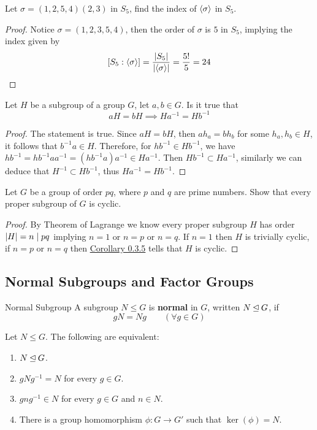 \documentclass[12pt,a4paper]{article}
\begin{document}
    \begin{ex}
        Let $\sigma=(1,2,5,4)(2,3)$ in $S_5$, find the index of $\langle \sigma \rangle$ in $S_5$.
    \end{ex}
    \begin{proof}
        Notice $\sigma=(1,2,3,5,4)$, then the order of $\sigma$ is $5$ in $S_5$, implying the index given by 
        \[
            [S_5:\langle \sigma \rangle]=\frac{\left\lvert S_5 \right\rvert}{\left\lvert \langle \sigma \rangle \right\rvert}=\frac{5!}{5}=24
        \]
    \end{proof}
    \bigskip

    \begin{ex}
        Let $H$ be a subgroup of a group $G$, let $a,b\in G$. Is it true that 
        \[
            aH=bH\implies Ha^{-1}=Hb^{-1}
        \]
    \end{ex}
    \begin{proof}
        The statement is true. Since $aH=bH$, then $ah_a=bh_b$ for some $h_a,h_b\in H$, it follows that $b^{-1}a\in H$. Therefore, for $hb^{-1}\in Hb^{-1}$, we have $hb^{-1}=hb^{-1}aa^{-1}=(hb^{-1}a)a^{-1}\in Ha^{-1}$. Then $Hb^{-1}\subset Ha^{-1}$, similarly we can deduce that $H^{-1}\subset Hb^{-1}$, thus $Ha^{-1}=Hb^{-1}.$
    \end{proof}
    \bigskip

    \begin{ex}
        Let $G$ be a group of order $pq$, where $p$ and $q$ are prime numbers. Show that every proper subgroup of $G$ is cyclic.
    \end{ex}
    \begin{proof}
        By Theorem of Lagrange we know every proper subgroup $H$ has order $\left\lvert H \right\rvert=n\mid pq$ implying $n=1$ or $n=p$ or $n=q$. If $n=1$ then $H$ is trivially cyclic, if $n=p$ or $n=q$ then \hyperref[0.3.5]{Corollary 0.3.5} tells that $H$ is cyclic.         
    \end{proof}

    \subsection{Normal Subgroups and Factor Groups}

    \begin{defi}{Normal Subgroup}
        A subgroup $N \le G$ is \textbf{normal} in $G$, written
        $N \unlhd G$, if
        \[
            gN = Ng \qquad (\forall g \in G)
        \]
    \end{defi}
    \bigskip
    
    \begin{thm}
        Let $N \le G$. The following are equivalent:
        \begin{enumerate}
            \item $N \unlhd G$.
            \item $gNg^{-1} = N$ for every $g \in G$.
            \item $gng^{-1} \in N$ for every $g \in G$ and $n \in N$.
            \item There is a group homomorphism $\phi:G\to G'$ such that $\ker(\phi)=N$.
        \end{enumerate}
    \end{thm}
    
\end{document}

